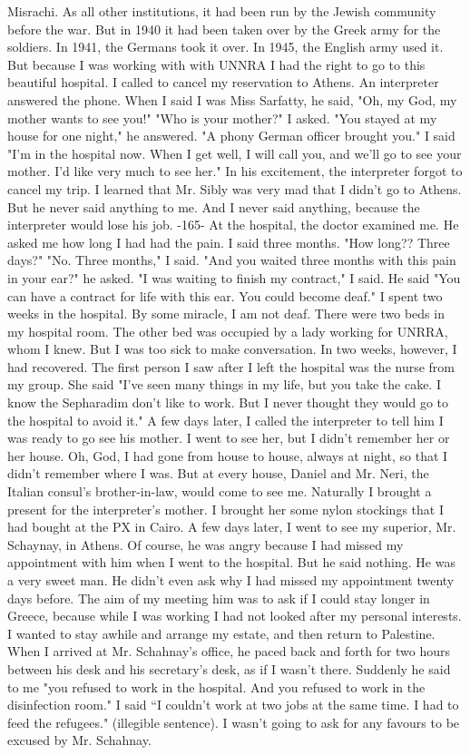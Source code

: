 Misrachi.
As all other institutions, it had been run by the Jewish 
community before the war.
But in 1940 it had been taken over by the Greek army for the
soldiers.
In 1941, the Germans took it over.
In 1945, the English army used it.
But 
because I was working with with UNNRA I had the right to go to this beautiful hospital.
I called to cancel my reservation to Athens.
An interpreter answered the phone.
When I said I was Miss Sarfatty, he said, "Oh, my God, my mother wants to see you!"
"Who is your mother?"
I asked.
"You stayed at my house for one night," he answered.
"A phony German officer 
brought you."
I said "I'm in the hospital now.
When I get well, I will call you, and we'll go 
to see your mother.
I'd like very much to see her."
In his excitement, the interpreter 
forgot to cancel my trip.
I learned that Mr.
Sibly was very mad that I didn't go to 
Athens.
But he never said anything to me.
And I never said anything, because the interpreter would lose his job.
-165- 
At the hospital, the doctor examined me.
He asked me how long I had had the pain.
I said three months.
"How long??
Three days?"
"No.
Three months," I said.
"And you waited three months with this pain in your ear?"
he asked.
"I was waiting to finish my contract," I said.
He said "You can have a contract for life with this ear.
You could become deaf."
I spent two weeks in the hospital.
By some miracle, I am not deaf.
There were two 
beds in my hospital room.
The other bed was occupied by a lady working for UNRRA, whom 
I knew.
But I was too sick to make conversation.
In two weeks, however, I had recovered.
The first person I saw after I left the hospital was the nurse from my group.
She 
said "I've seen many things in my life, but you take the cake.
I know the Sepharadim 
don't like to work.
But I never thought they would go to the hospital to avoid it."
A few days later, I called the interpreter to tell him I was ready to go see his 
mother.
I went to see her, but I didn't remember her or her house.
Oh, God, I had gone 
from house to house, always at night, so that I didn't remember where I was.
But at 
every house, Daniel and Mr.
Neri, the Italian consul's brother-in-law, would come to see 
me.
Naturally I brought a present for the interpreter's mother.
I brought her some 
nylon stockings that I had bought at the PX in Cairo.
A few days later, I went to see my superior, Mr.
Schaynay, in Athens.
Of course, 
he was angry because I had missed my appointment with him when I went to the hospital.
But he said nothing.
He was a very sweet man.
He didn't even ask why I had missed my 
appointment twenty days before.
The aim of my meeting him was to ask if I could stay 
longer in Greece, because while I was working I had not looked after my personal interests.
I wanted to stay awhile and arrange my estate, and then return to Palestine.
When I arrived at Mr.
Schahnay's office, he paced back and forth for two hours 
between his desk and his secretary's desk, as if I wasn't there.
Suddenly he said to me 
"you refused to work in the hospital.
And you refused to work in the disinfection room."
I said “I couldn't work at two jobs at the same time.
I had to feed the refugees."
(illegible sentence).
I wasn’t going to ask for any favours to be excused by Mr.
Schahnay.